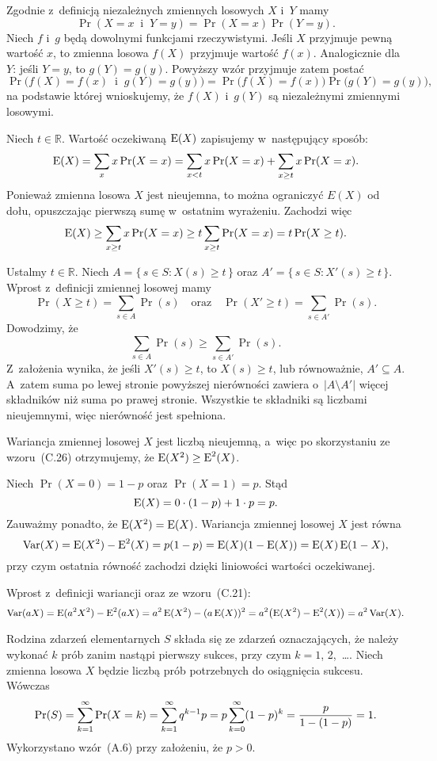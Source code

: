 \exercise %
Zgodnie z~definicją niezależnych zmiennych losowych $X$ i~$Y$ mamy
\[
	\Pr(X=x\;\;\text{i}\;\;Y=y) = \Pr(X=x)\Pr(Y=y).
\]
Niech $f$ i~$g$ będą dowolnymi funkcjami rzeczywistymi. Jeśli $X$ przyjmuje pewną wartość $x$, to zmienna losowa $f(X)$ przyjmuje wartość $f(x)$. Analogicznie dla $Y$: jeśli $Y=y$, to $g(Y)=g(y)$. Powyższy wzór przyjmuje zatem postać
\[
	\Pr\bigl(f(X)=f(x)\;\;\text{i}\;\;g(Y)=g(y)\bigr) = \Pr\bigl(f(X)=f(x)\bigr)\Pr\bigl(g(Y)=g(y)\bigr),
\]
na podstawie której wnioskujemy, że $f(X)$ i~$g(Y)$ są niezależnymi zmiennymi losowymi.

\exercise %
Niech $t\in\mathbb{R}$. Wartość oczekiwaną $\operatorname{E}(X)$ zapisujemy w~następujący sposób:
\[
    \operatorname{E}(X) = \sum_xx\Pr(X=x) = \sum_{x<t}x\Pr(X=x)+\sum_{x\ge t}x\Pr(X=x).
\]
Ponieważ zmienna losowa $X$ jest nieujemna, to można ograniczyć $E(X)$ od dołu, opuszczając pierwszą sumę w~ostatnim wyrażeniu. Zachodzi więc
\[
    \operatorname{E}(X) \ge \sum_{x\ge t}x\Pr(X=x) \ge t\sum_{x\ge t}\Pr(X=x) = t\Pr(X\ge t).
\]

\exercise %
Ustalmy $t\in\mathbb{R}$. Niech $A=\{\,s\in S:X(s)\ge t\,\}$ oraz $A'=\{\,s\in S:X'(s)\ge t\,\}$. Wprost z~definicji zmiennej losowej mamy
\[
	\Pr(X\ge t) = \sum_{s\in A}\Pr(s) \quad\text{oraz}\quad \Pr(X'\ge t) = \sum_{s\in A'}\Pr(s).
\]
Dowodzimy, że
\[
	\sum_{s\in A}\Pr(s) \ge \sum_{s\in A'}\Pr(s).
\]
Z~założenia wynika, że jeśli $X'(s)\ge t$, to $X(s)\ge t$, lub równoważnie, $A'\subseteq A$. A~zatem suma po lewej stronie powyższej nierówności zawiera o~$|A\setminus A'|$ więcej składników niż suma po prawej stronie. Wszystkie te składniki są liczbami nieujemnymi, więc nierówność jest spełniona.

\exercise %
Wariancja zmiennej losowej $X$ jest liczbą nieujemną, a~więc po skorzystaniu ze wzoru~(C.26) otrzymujemy, że $\operatorname{E}(X^2)\ge\operatorname{E}^2(X)$.

\exercise %
Niech $\Pr(X=0)=1-p$ oraz $\Pr(X=1)=p$. Stąd
\[
    \operatorname{E}(X)=0\cdot(1-p)+1\cdot p=p.
\]
Zauważmy ponadto, że $\operatorname{E}(X^2)=\operatorname{E}(X)$. Wariancja zmiennej losowej $X$ jest równa
\[
	\operatorname{Var}(X) = \operatorname{E}(X^2)-\operatorname{E}^2(X) = p(1-p) = \operatorname{E}(X)(1-\operatorname{E}(X)) = \operatorname{E}(X)\operatorname{E}(1-X),
\]
przy czym ostatnia równość zachodzi dzięki liniowości wartości oczekiwanej.

\exercise %
Wprost z~definicji wariancji oraz ze wzoru~(C.21):
\[
	\operatorname{Var}(aX) = \operatorname{E}(a^2X^2)-\operatorname{E}^2(aX) = a^2\operatorname{E}(X^2)-(a\operatorname{E}(X))^2 = a^2\bigl(\operatorname{E}(X^2)-\operatorname{E}^2(X)\bigr) = a^2\operatorname{Var}(X).
\]


\exercise %
Rodzina zdarzeń elementarnych $S$ składa się ze zdarzeń oznaczających, że należy wykonać $k$ prób zanim nastąpi pierwszy sukces, przy czym $k=1$, 2,~\dots. Niech zmienna losowa $X$ będzie liczbą prób potrzebnych do osiągnięcia sukcesu. Wówczas
\[
	\Pr(S) = \sum_{k=1}^\infty\Pr(X=k) = \sum_{k=1}^\infty q^{k-1}p = p\sum_{k=0}^\infty(1-p)^k = \frac{p}{1-(1-p)} \\[1mm] = 1.
\]
Wykorzystano wzór~(A.6) przy założeniu, że $p>0$.

